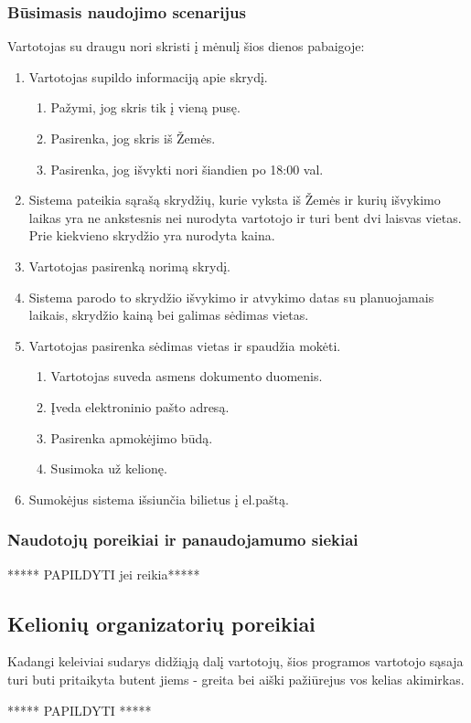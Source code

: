 \documentclass{VUMIFPSkursinis}
\begin{document}
\subsubsection{Būsimasis naudojimo scenarijus}
Vartotojas su draugu nori skristi į mėnulį šios dienos pabaigoje:
\begin{enumerate}
\item  Vartotojas supildo informaciją apie skrydį.
\begin{enumerate}[label*=\arabic*.]
\item Pažymi, jog skris tik į vieną pusę.
\item Pasirenka, jog skris iš Žemės.
\item  Pasirenka, jog išvykti nori šiandien po 18:00 val.
\end{enumerate}
\item  Sistema pateikia sąrašą skrydžių, kurie vyksta iš Žemės ir kurių išvykimo laikas yra ne ankstesnis nei nurodyta vartotojo ir turi bent dvi laisvas vietas. Prie kiekvieno skrydžio yra nurodyta kaina.
\item Vartotojas pasirenką norimą skrydį.
\item Sistema parodo to skrydžio išvykimo ir atvykimo datas su planuojamais laikais, skrydžio kainą bei galimas sėdimas vietas.
\item Vartotojas pasirenka sėdimas vietas ir spaudžia mokėti.
\begin{enumerate}[label*=\arabic*.]
\item Vartotojas suveda asmens dokumento duomenis.
\item Įveda elektroninio pašto adresą.
\item Pasirenka apmokėjimo būdą.
\item  Susimoka už kelionę.
\end{enumerate}
\item   Sumokėjus sistema išsiunčia  bilietus į el.paštą.
\end{enumerate}

\subsubsection{Naudotojų poreikiai ir panaudojamumo siekiai}
\centerline{***** PAPILDYTI jei reikia*****}

\subsection{Kelionių organizatorių poreikiai}
Kadangi keleiviai sudarys didžiąją dalį vartotojų, šios programos vartotojo sąsaja turi buti pritaikyta butent jiems - greita bei aiški pažiūrejus vos kelias akimirkas.
\centerline{***** PAPILDYTI *****}


\printbibliography[heading=bibintoc, title=Šaltiniai]  %
\end{document}
